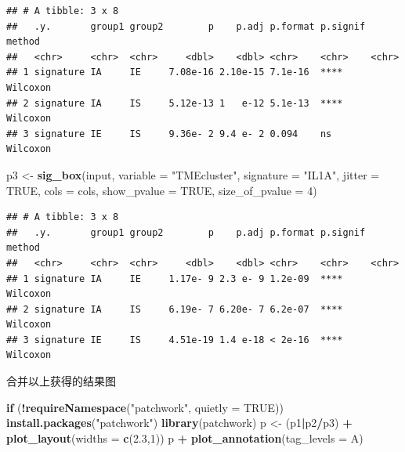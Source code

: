 \documentclass[
  12pt,
]{book}
\newenvironment{Shaded}{\begin{snugshade}}{\end{snugshade}}
\newcommand{\AttributeTok}[1]{\textcolor[rgb]{0.13,0.29,0.53}{#1}}
\newcommand{\ConstantTok}[1]{\textcolor[rgb]{0.56,0.35,0.01}{#1}}
\newcommand{\ControlFlowTok}[1]{\textcolor[rgb]{0.13,0.29,0.53}{\textbf{#1}}}
\newcommand{\DecValTok}[1]{\textcolor[rgb]{0.00,0.00,0.81}{#1}}
\newcommand{\FloatTok}[1]{\textcolor[rgb]{0.00,0.00,0.81}{#1}}
\newcommand{\FunctionTok}[1]{\textcolor[rgb]{0.13,0.29,0.53}{\textbf{#1}}}
\newcommand{\NormalTok}[1]{#1}
\newcommand{\OtherTok}[1]{\textcolor[rgb]{0.56,0.35,0.01}{#1}}
\newcommand{\SpecialCharTok}[1]{\textcolor[rgb]{0.81,0.36,0.00}{\textbf{#1}}}
\newcommand{\StringTok}[1]{\textcolor[rgb]{0.31,0.60,0.02}{#1}}
\theoremstyle{definition}
\theoremstyle{definition}
\theoremstyle{definition}
\theoremstyle{definition}
\theoremstyle{remark}
\begin{document}
\begin{verbatim}
## # A tibble: 3 x 8
##   .y.       group1 group2        p    p.adj p.format p.signif method  
##   <chr>     <chr>  <chr>     <dbl>    <dbl> <chr>    <chr>    <chr>   
## 1 signature IA     IE     7.08e-16 2.10e-15 7.1e-16  ****     Wilcoxon
## 2 signature IA     IS     5.12e-13 1   e-12 5.1e-13  ****     Wilcoxon
## 3 signature IE     IS     9.36e- 2 9.4 e- 2 0.094    ns       Wilcoxon
\end{verbatim}

\begin{Shaded}
\begin{Highlighting}[]
\NormalTok{p3 }\OtherTok{\textless{}{-}} \FunctionTok{sig\_box}\NormalTok{(input, }\AttributeTok{variable =} \StringTok{"TMEcluster"}\NormalTok{, }\AttributeTok{signature =} \StringTok{"IL1A"}\NormalTok{,  }
              \AttributeTok{jitter =} \ConstantTok{TRUE}\NormalTok{, }\AttributeTok{cols =}\NormalTok{  cols, }\AttributeTok{show\_pvalue =} \ConstantTok{TRUE}\NormalTok{, }\AttributeTok{size\_of\_pvalue =} \DecValTok{4}\NormalTok{)}
\end{Highlighting}
\end{Shaded}

\begin{verbatim}
## # A tibble: 3 x 8
##   .y.       group1 group2        p    p.adj p.format p.signif method  
##   <chr>     <chr>  <chr>     <dbl>    <dbl> <chr>    <chr>    <chr>   
## 1 signature IA     IE     1.17e- 9 2.3 e- 9 1.2e-09  ****     Wilcoxon
## 2 signature IA     IS     6.19e- 7 6.20e- 7 6.2e-07  ****     Wilcoxon
## 3 signature IE     IS     4.51e-19 1.4 e-18 < 2e-16  ****     Wilcoxon
\end{verbatim}

合并以上获得的结果图

\begin{Shaded}
\begin{Highlighting}[]
\ControlFlowTok{if}\NormalTok{ (}\SpecialCharTok{!}\FunctionTok{requireNamespace}\NormalTok{(}\StringTok{"patchwork"}\NormalTok{, }\AttributeTok{quietly =} \ConstantTok{TRUE}\NormalTok{))   }\FunctionTok{install.packages}\NormalTok{(}\StringTok{"patchwork"}\NormalTok{)}
\FunctionTok{library}\NormalTok{(patchwork)}
\NormalTok{p }\OtherTok{\textless{}{-}}\NormalTok{ (p1}\SpecialCharTok{|}\NormalTok{p2}\SpecialCharTok{/}\NormalTok{p3) }\SpecialCharTok{+} \FunctionTok{plot\_layout}\NormalTok{(}\AttributeTok{widths =} \FunctionTok{c}\NormalTok{(}\FloatTok{2.3}\NormalTok{,}\DecValTok{1}\NormalTok{))}
\NormalTok{p }\SpecialCharTok{+} \FunctionTok{plot\_annotation}\NormalTok{(}\AttributeTok{tag\_levels =} \StringTok{\textquotesingle{}A\textquotesingle{}}\NormalTok{)}
\end{Highlighting}
\end{Shaded}
\end{document}
